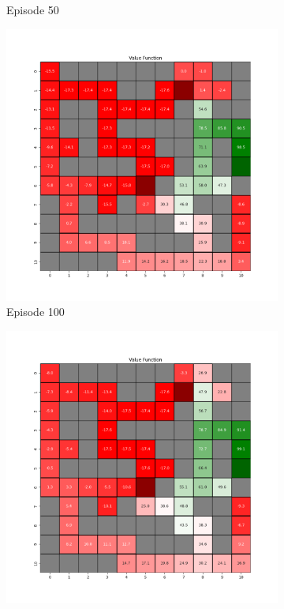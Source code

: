\documentclass{assignment}
\begin{document}
\begin{figure}[H]
\begin{subfigure}{0.3\textwidth}
    \caption{Episode 50}
    \end{subfigure}\hfill
    \begin{subfigure}{0.3\textwidth}
        \includegraphics[width=\textwidth]{figures/value_q/alpha_sweep/value_function_alpha_0.5_gamma_0.95_epsilon_0.2_iteration_100.png}
    \caption{Episode 100}
    \end{subfigure}
    \begin{subfigure}{0.3\textwidth}
        \includegraphics[width=\textwidth]{figures/value_q/alpha_sweep/value_function_alpha_0.5_gamma_0.95_epsilon_0.2_iteration_1000.png}

\end{subfigure}
\end{figure}
\end{document}
